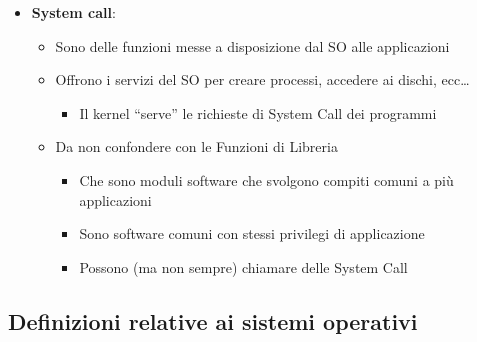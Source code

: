 \documentclass[]{article}
\providecommand{\tightlist}{%
  \setlength{\itemsep}{0pt}\setlength{\parskip}{0pt}}
\begin{document}
\begin{itemize}
\tightlist
\item
  \textbf{System call}:

  \begin{itemize}
  \tightlist
  \item
    Sono delle funzioni messe a disposizione dal SO alle applicazioni
  \item
    Offrono i servizi del SO per creare processi, accedere ai dischi,
    ecc\ldots{}

    \begin{itemize}
    \tightlist
    \item
      Il kernel ``serve'' le richieste di System Call dei programmi
    \end{itemize}
  \item
    Da non confondere con le Funzioni di Libreria

    \begin{itemize}
    \tightlist
    \item
      Che sono moduli software che svolgono compiti comuni a più
      applicazioni
    \item
      Sono software comuni con stessi privilegi di applicazione
    \item
      Possono (ma non sempre) chiamare delle System Call
    \end{itemize}
  \end{itemize}
\end{itemize}

\hypertarget{definizioni-relative-ai-sistemi-operativi-2}{%
\subsection{Definizioni relative ai sistemi
operativi}\label{definizioni-relative-ai-sistemi-operativi-2}}
\end{document}
